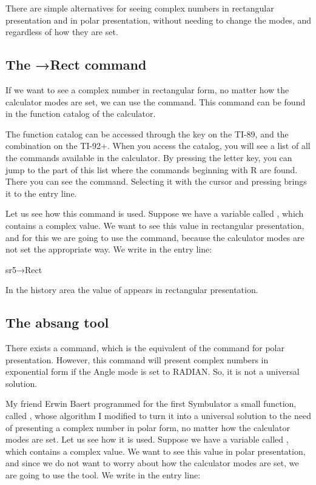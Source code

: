 There are simple alternatives for seeing complex numbers in
rectangular presentation and in polar presentation, without needing
to change the modes, and regardless of how they are set.

\subsection{The →Rect command}

If we want to see a complex number in rectangular form, no matter
how the calculator modes are set, we can use the 
command. This command can be found in the function catalog of the
calculator.

The function catalog can be accessed through the  key
on the TI-89, and the combination   on the TI-92+.
When you access the catalog, you will see a list of all the commands
available in the calculator. By pressing the  letter key, you
can jump to the part of this list where the commands beginning with
R are found. There you can see the  command. Selecting
it with the cursor and pressing  brings it to the entry
line.

Let us see how this command is used. Suppose we have a variable
called , which contains a complex value. We want to see
this value in rectangular presentation, and for this we are going to
use the  command, because the calculator modes are not
set the appropriate way. We write in the entry line:

\begin{entry}
sr5→Rect
\end{entry}

In the history area the value of  appears in rectangular
presentation.

\subsection{The absang tool}

There exists a  command, which is the equivalent of the
 command for polar presentation. However, this command
will present complex numbers in exponential form if the Angle mode
is set to RADIAN. So, it is not a universal solution.

My friend Erwin Baert programmed for the first Symbulator a small
function, called , whose algorithm I modified to turn
it into a universal solution to the need of presenting a complex
number in polar form, no matter how the calculator modes are set.
Let us see how it is used. Suppose we have a variable called
, which contains a complex value. We want to see this
value in polar presentation, and since we do not want to worry about
how the calculator modes are set, we are going to use the
 tool. We write in the entry line:

